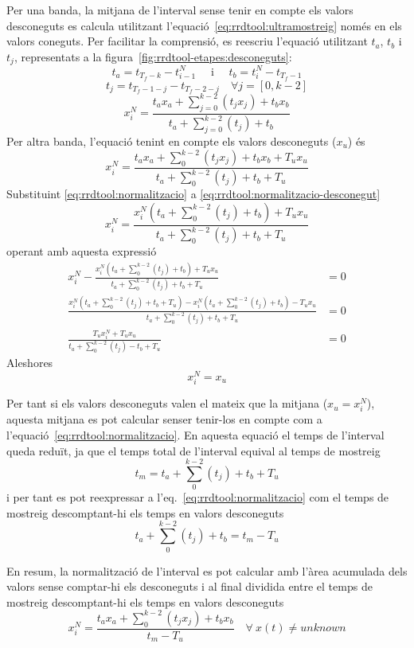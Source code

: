 Per una banda, la mitjana de l'interval sense tenir en compte els valors desconeguts es calcula utilitzant l'equació~\eqref{eq:rrdtool:ultramostreig} només en els valors coneguts. Per facilitar la comprensió, es reescriu l'equació utilitzant $t_a$, $t_b$ i $t_j$, representats a la figura~\ref{fig:rrdtool-etapes:desconeguts}:
$$%
t_a =t_{T_f-k}-t^N_{i-1} \quad\text{ i }\quad t_b = t^N_i-t_{T_f-1}
$$
$$
t_j =t_{T_f-1-j}-t_{T_f-2-j} \quad\forall j=[0,k-2]
$$
\begin{equation}\label{eq:rrdtool:normalitzacio}
x^N_i = \frac{t_ax_a+\sum\limits_{j=0}^{k-2} (t_jx_j)+t_bx_b}{t_a+\sum\limits_{j=0}^{k-2} (t_j)+t_b}
\end{equation}
Per altra banda, l'equació tenint en compte els valors desconeguts ($x_u$) és
\begin{equation}\label{eq:rrdtool:normalitzacio-desconegut}
x^N_i = \frac{t_ax_a+\sum\limits_0^{k-2} (t_jx_j)+t_bx_b+T_ux_u}{t_a+\sum\limits_0^{k-2} (t_j)+t_b+T_u}
\end{equation}
Substituint \eqref{eq:rrdtool:normalitzacio} a \eqref{eq:rrdtool:normalitzacio-desconegut} 
\[
x^N_i = \frac{ x_i^N(t_a+\sum\limits_0^{k-2} (t_j)+t_b)+T_ux_u}{t_a+\sum\limits_0^{k-2} (t_j)+t_b+T_u}
\]
operant amb aquesta expressió
\begin{align*}
 x^N_i - \frac{ x_i^N(t_a+\sum\limits_0^{k-2} (t_j)+t_b)+T_ux_u}{t_a+\sum\limits_0^{k-2} (t_j)+t_b+T_u} &= 0\\
 \frac{x^N_i(t_a+\sum\limits_0^{k-2} (t_j)+t_b+T_u) -  x_i^N(t_a+\sum\limits_0^{k-2} (t_j)+t_b)-T_ux_u}{t_a+\sum\limits_0^{k-2} (t_j)+t_b+T_u} &= 0\\
\frac{T_ux_i^N+T_ux_u}{t_a+\sum\limits_0^{k-2} (t_j)-t_b+T_u} &= 0
\end{align*}
Aleshores
\[
x_i^N = x_u
\]


Per tant si els valors desconeguts valen el mateix que la mitjana ($x_u=x^N_i$), aquesta mitjana es pot calcular senser tenir-los en compte com a l'equació~\ref{eq:rrdtool:normalitzacio}. En aquesta equació el temps de l'interval queda reduït, ja que el temps total de l'interval equival al temps de mostreig
$$
t_m= t_a+\sum\limits_0^{k-2} (t_j)+t_b+T_u
$$
i per tant es pot reexpressar a l'eq.~\ref{eq:rrdtool:normalitzacio} com el temps de mostreig descomptant-hi els temps en valors desconeguts
$$
t_a+\sum\limits_0^{k-2} (t_j)+t_b = t_m -T_u
$$

En resum, la normalització de l'interval es pot calcular amb l'àrea acumulada dels valors sense comptar-hi els desconeguts i al final dividida entre el temps de mostreig descomptant-hi els temps en valors desconeguts
$$
x^N_i = \frac{t_ax_a+\sum\limits_0^{k-2} (t_jx_j)+t_bx_b}{t_m - T_u}
\quad\forall\ x(t)\neq unknown
$$


